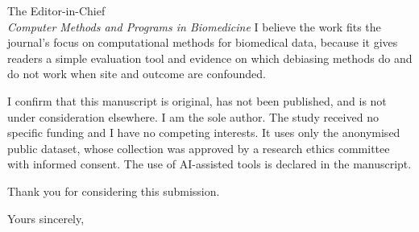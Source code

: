 \documentclass[11pt]{letter}
\begin{document}
\begin{letter}{The Editor-in-Chief\\
\textit{Computer Methods and Programs in Biomedicine}}
I believe the work fits the journal's focus on computational methods for biomedical data, because it gives readers a simple evaluation tool and evidence on which debiasing methods do and do not work when site and outcome are confounded.

I confirm that this manuscript is original, has not been published, and is not under consideration elsewhere. I am the sole author. The study received no specific funding and I have no competing interests. It uses only the anonymised public dataset, whose collection was approved by a research ethics committee with informed consent. The use of AI-assisted tools is declared in the manuscript.

Thank you for considering this submission.

\closing{Yours sincerely,}
\end{letter}
\end{document}
